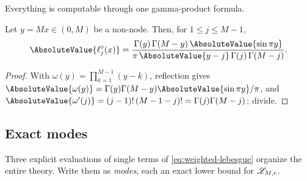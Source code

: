 Everything is computable through one gamma-product formula.

\begin{lemma}
\label{lem:gamma-cardinal}
Let $y=Mx\in(0,M)$ be a non-node.  Then, for $1\le j\le M-1$,
\begin{equation}
 \AbsoluteValue{\ell^{\circ}_j(x)}
 =\frac{\Gamma(y)\,\Gamma(M-y)\,\AbsoluteValue{\sin\pi y}}
 {\pi\,\AbsoluteValue{y-j}\,\Gamma(j)\,\Gamma(M-j)}.
 \label{eq:gamma-cardinal}
\end{equation}
\end{lemma}

\begin{proof}
With $\omega(y)=\prod_{k=1}^{M-1}(y-k)$, reflection gives
$\AbsoluteValue{\omega(y)}=\Gamma(y)\Gamma(M-y)\AbsoluteValue{\sin\pi y}/\pi$, and
$\AbsoluteValue{\omega'(j)}=(j-1)!\,(M-1-j)!=\Gamma(j)\Gamma(M-j)$; divide.
\end{proof}

\subsection{Exact modes}

Three explicit evaluations of single terms of
\eqref{eq:weighted-lebesgue} organize the entire theory.  Write them
as \emph{modes}, each an exact lower bound for $\mathscr L_{M,r}$.

